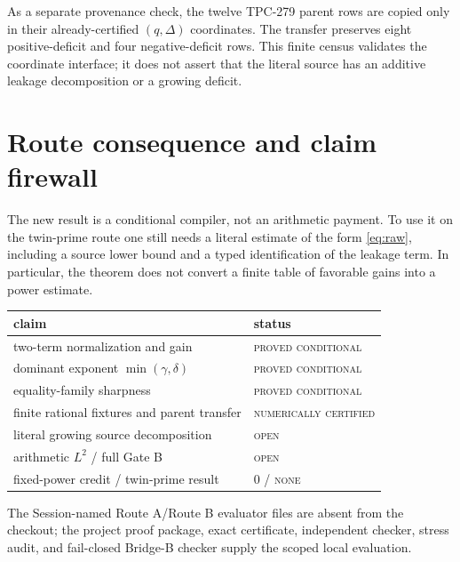 \documentclass[11pt]{article}
\begin{document}
As a separate provenance check, the twelve TPC-279 parent rows are copied only
in their already-certified $(q,\Delta)$ coordinates.  The transfer preserves
eight positive-deficit and four negative-deficit rows.  This finite census
validates the coordinate interface; it does not assert that the literal source
has an additive leakage decomposition or a growing deficit.

\section{Route consequence and claim firewall}

The new result is a conditional compiler, not an arithmetic payment.  To use
it on the twin-prime route one still needs a literal estimate of the form
\eqref{eq:raw}, including a source lower bound and a typed identification of
the leakage term.  In particular, the theorem does not convert a finite table
of favorable gains into a power estimate.

\begin{center}
\begin{tabular}{ll}
\toprule
claim & status\\
\midrule
two-term normalization and gain & \textsc{proved conditional}\\
dominant exponent $\min(\gamma,\delta)$ & \textsc{proved conditional}\\
equality-family sharpness & \textsc{proved conditional}\\
finite rational fixtures and parent transfer & \textsc{numerically certified}\\
literal growing source decomposition & \textsc{open}\\
arithmetic $L^2$ / full Gate B & \textsc{open}\\
fixed-power credit / twin-prime result & $0$ / \textsc{none}\\
\bottomrule
\end{tabular}
\end{center}

The Session-named Route A/Route B evaluator files are absent from the checkout;
the project proof package, exact certificate, independent checker, stress audit,
and fail-closed Bridge-B checker supply the scoped local evaluation.



\end{document}
